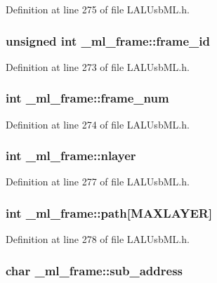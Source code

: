 Definition at line 275 of file LALUsbML.h.\hypertarget{struct__ml__frame_a0c4a762a0c824490d209cd4705572eba}{
\subsubsection[{frame\_\-id}]{\setlength{\rightskip}{0pt plus 5cm}unsigned int {\bf \_\-ml\_\-frame::frame\_\-id}}}
\label{struct__ml__frame_a0c4a762a0c824490d209cd4705572eba}


Definition at line 273 of file LALUsbML.h.\hypertarget{struct__ml__frame_ad91a6f0e37163fda1c1e1319fcac564d}{
\subsubsection[{frame\_\-num}]{\setlength{\rightskip}{0pt plus 5cm}int {\bf \_\-ml\_\-frame::frame\_\-num}}}
\label{struct__ml__frame_ad91a6f0e37163fda1c1e1319fcac564d}


Definition at line 274 of file LALUsbML.h.\hypertarget{struct__ml__frame_aae489f8d32e2a4d60ed976c44b8a4495}{
\subsubsection[{nlayer}]{\setlength{\rightskip}{0pt plus 5cm}int {\bf \_\-ml\_\-frame::nlayer}}}
\label{struct__ml__frame_aae489f8d32e2a4d60ed976c44b8a4495}


Definition at line 277 of file LALUsbML.h.\hypertarget{struct__ml__frame_a16f43a5a0b9c1d56c2abeac26429ed54}{
\subsubsection[{path}]{\setlength{\rightskip}{0pt plus 5cm}int {\bf \_\-ml\_\-frame::path}\mbox{[}MAXLAYER\mbox{]}}}
\label{struct__ml__frame_a16f43a5a0b9c1d56c2abeac26429ed54}


Definition at line 278 of file LALUsbML.h.\hypertarget{struct__ml__frame_a52d6a12345a0cc37bfc2d5c29e09d47b}{
\subsubsection[{sub\_\-address}]{\setlength{\rightskip}{0pt plus 5cm}char {\bf \_\-ml\_\-frame::sub\_\-address}}}
\label{struct__ml__frame_a52d6a12345a0cc37bfc2d5c29e09d47b}


